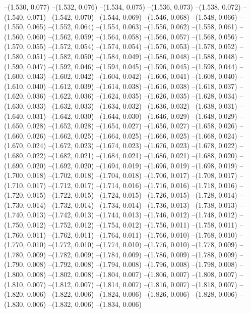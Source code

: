 --(1.530, 0.077)
--(1.532, 0.076)
--(1.534, 0.075)
--(1.536, 0.073)
--(1.538, 0.072)
--(1.540, 0.071)
--(1.542, 0.070)
--(1.544, 0.069)
--(1.546, 0.068)
--(1.548, 0.066)
--(1.550, 0.065)
--(1.552, 0.064)
--(1.554, 0.063)
--(1.556, 0.062)
--(1.558, 0.061)
--(1.560, 0.060)
--(1.562, 0.059)
--(1.564, 0.058)
--(1.566, 0.057)
--(1.568, 0.056)
--(1.570, 0.055)
--(1.572, 0.054)
--(1.574, 0.054)
--(1.576, 0.053)
--(1.578, 0.052)
--(1.580, 0.051)
--(1.582, 0.050)
--(1.584, 0.049)
--(1.586, 0.048)
--(1.588, 0.048)
--(1.590, 0.047)
--(1.592, 0.046)
--(1.594, 0.045)
--(1.596, 0.045)
--(1.598, 0.044)
--(1.600, 0.043)
--(1.602, 0.042)
--(1.604, 0.042)
--(1.606, 0.041)
--(1.608, 0.040)
--(1.610, 0.040)
--(1.612, 0.039)
--(1.614, 0.038)
--(1.616, 0.038)
--(1.618, 0.037)
--(1.620, 0.036)
--(1.622, 0.036)
--(1.624, 0.035)
--(1.626, 0.035)
--(1.628, 0.034)
--(1.630, 0.033)
--(1.632, 0.033)
--(1.634, 0.032)
--(1.636, 0.032)
--(1.638, 0.031)
--(1.640, 0.031)
--(1.642, 0.030)
--(1.644, 0.030)
--(1.646, 0.029)
--(1.648, 0.029)
--(1.650, 0.028)
--(1.652, 0.028)
--(1.654, 0.027)
--(1.656, 0.027)
--(1.658, 0.026)
--(1.660, 0.026)
--(1.662, 0.025)
--(1.664, 0.025)
--(1.666, 0.025)
--(1.668, 0.024)
--(1.670, 0.024)
--(1.672, 0.023)
--(1.674, 0.023)
--(1.676, 0.023)
--(1.678, 0.022)
--(1.680, 0.022)
--(1.682, 0.021)
--(1.684, 0.021)
--(1.686, 0.021)
--(1.688, 0.020)
--(1.690, 0.020)
--(1.692, 0.020)
--(1.694, 0.019)
--(1.696, 0.019)
--(1.698, 0.019)
--(1.700, 0.018)
--(1.702, 0.018)
--(1.704, 0.018)
--(1.706, 0.017)
--(1.708, 0.017)
--(1.710, 0.017)
--(1.712, 0.017)
--(1.714, 0.016)
--(1.716, 0.016)
--(1.718, 0.016)
--(1.720, 0.015)
--(1.722, 0.015)
--(1.724, 0.015)
--(1.726, 0.015)
--(1.728, 0.014)
--(1.730, 0.014)
--(1.732, 0.014)
--(1.734, 0.014)
--(1.736, 0.013)
--(1.738, 0.013)
--(1.740, 0.013)
--(1.742, 0.013)
--(1.744, 0.013)
--(1.746, 0.012)
--(1.748, 0.012)
--(1.750, 0.012)
--(1.752, 0.012)
--(1.754, 0.012)
--(1.756, 0.011)
--(1.758, 0.011)
--(1.760, 0.011)
--(1.762, 0.011)
--(1.764, 0.011)
--(1.766, 0.010)
--(1.768, 0.010)
--(1.770, 0.010)
--(1.772, 0.010)
--(1.774, 0.010)
--(1.776, 0.010)
--(1.778, 0.009)
--(1.780, 0.009)
--(1.782, 0.009)
--(1.784, 0.009)
--(1.786, 0.009)
--(1.788, 0.009)
--(1.790, 0.008)
--(1.792, 0.008)
--(1.794, 0.008)
--(1.796, 0.008)
--(1.798, 0.008)
--(1.800, 0.008)
--(1.802, 0.008)
--(1.804, 0.007)
--(1.806, 0.007)
--(1.808, 0.007)
--(1.810, 0.007)
--(1.812, 0.007)
--(1.814, 0.007)
--(1.816, 0.007)
--(1.818, 0.007)
--(1.820, 0.006)
--(1.822, 0.006)
--(1.824, 0.006)
--(1.826, 0.006)
--(1.828, 0.006)
--(1.830, 0.006)
--(1.832, 0.006)
--(1.834, 0.006)
